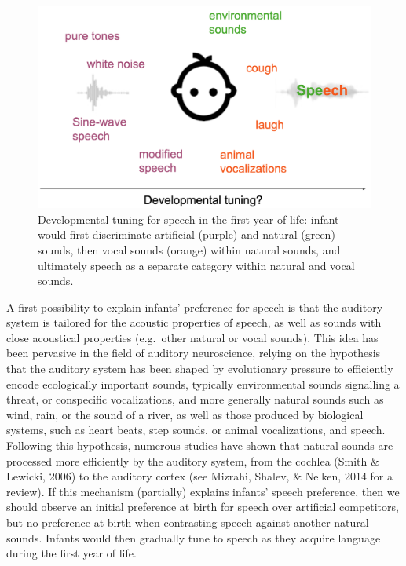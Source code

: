 \documentclass[
  english,
  man]{apa6}
\begin{document}
\begin{figure}
\includegraphics[width=5.31in]{figures_intro/tuning} \caption{Developmental tuning for speech in the first year of life: infant would first discriminate artificial (purple) and natural (green) sounds, then vocal sounds (orange) within natural sounds, and ultimately speech as a separate category within natural and vocal sounds.}\label{fig:venn}
\end{figure}

A first possibility to explain infants' preference for speech is that the auditory system is tailored for the acoustic properties of speech, as well as sounds with close acoustical properties (e.g.~other natural or vocal sounds). This idea has been pervasive in the field of auditory neuroscience, relying on the hypothesis that the auditory system has been shaped by evolutionary pressure to efficiently encode ecologically important sounds, typically environmental sounds signalling a threat, or conspecific vocalizations, and more generally natural sounds such as wind, rain, or the sound of a river, as well as those produced by biological systems, such as heart beats, step sounds, or animal vocalizations, and speech. Following this hypothesis, numerous studies have shown that natural sounds are processed more efficiently by the auditory system, from the cochlea (Smith \& Lewicki, 2006) to the auditory cortex (see Mizrahi, Shalev, \& Nelken, 2014 for a review). If this mechanism (partially) explains infants' speech preference, then we should observe an initial preference at birth for speech over artificial competitors, but no preference at birth when contrasting speech against another natural sounds. Infants would then gradually tune to speech as they acquire language during the first year of life.
\end{document}

